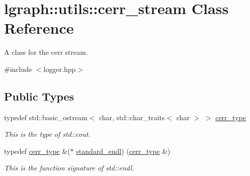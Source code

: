\hypertarget{classlgraph_1_1utils_1_1cerr__stream}{}\section{lgraph\+:\+:utils\+:\+:cerr\+\_\+stream Class Reference}
\label{classlgraph_1_1utils_1_1cerr__stream}


A class for the cerr stream.  




{\ttfamily \#include $<$logger.\+hpp$>$}

\subsection*{Public Types}
\begin{DoxyCompactItemize}
\item 
typedef std\+::basic\+\_\+ostream$<$ char, std\+::char\+\_\+traits$<$ char $>$ $>$ \hyperlink{classlgraph_1_1utils_1_1cerr__stream_a60b0847503d146249b71e70473740f57}{cerr\+\_\+type}\hypertarget{classlgraph_1_1utils_1_1cerr__stream_a60b0847503d146249b71e70473740f57}{}\label{classlgraph_1_1utils_1_1cerr__stream_a60b0847503d146249b71e70473740f57}

\begin{DoxyCompactList}\small\item\em This is the type of std\+::cout. \end{DoxyCompactList}\item 
typedef \hyperlink{classlgraph_1_1utils_1_1cerr__stream_a60b0847503d146249b71e70473740f57}{cerr\+\_\+type} \&($\ast$ \hyperlink{classlgraph_1_1utils_1_1cerr__stream_a8b7e7603a4e656bd2d9196ae0f530c7b}{standard\+\_\+endl}) (\hyperlink{classlgraph_1_1utils_1_1cerr__stream_a60b0847503d146249b71e70473740f57}{cerr\+\_\+type} \&)\hypertarget{classlgraph_1_1utils_1_1cerr__stream_a8b7e7603a4e656bd2d9196ae0f530c7b}{}\label{classlgraph_1_1utils_1_1cerr__stream_a8b7e7603a4e656bd2d9196ae0f530c7b}

\begin{DoxyCompactList}\small\item\em This is the function signature of std\+::endl. \end{DoxyCompactList}\end{DoxyCompactItemize}
